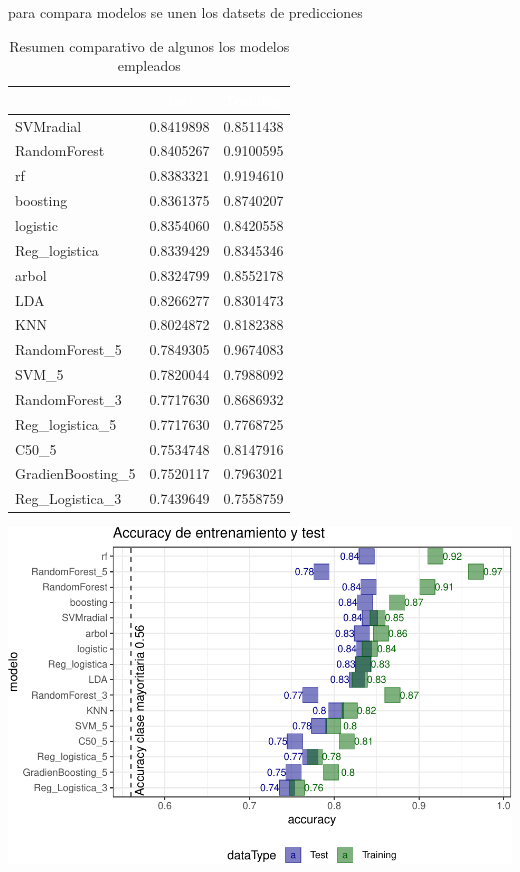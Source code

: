 \documentclass[]{article}
\begin{document}
para compara modelos se unen los datsets de predicciones

\begin{table}[!h]

\caption{\label{tab:cuadro_comparativo-modelos}Resumen comparativo de algunos los modelos empleados}
\centering
\begin{tabular}[t]{lrr}
\toprule
\rowcolor{black}  \multicolumn{1}{c}{\textcolor{white}{\textbf{object}}} & \multicolumn{1}{c}{\textcolor{white}{\textbf{Test}}} & \multicolumn{1}{c}{\textcolor{white}{\textbf{Training}}}\\
\midrule
\rowcolor{gray!6}  SVMradial & 0.8419898 & 0.8511438\\
RandomForest & 0.8405267 & 0.9100595\\
\rowcolor{gray!6}  rf & 0.8383321 & 0.9194610\\
boosting & 0.8361375 & 0.8740207\\
\rowcolor{gray!6}  logistic & 0.8354060 & 0.8420558\\
\addlinespace
Reg\_logistica & 0.8339429 & 0.8345346\\
\rowcolor{gray!6}  arbol & 0.8324799 & 0.8552178\\
LDA & 0.8266277 & 0.8301473\\
\rowcolor{gray!6}  KNN & 0.8024872 & 0.8182388\\
RandomForest\_5 & 0.7849305 & 0.9674083\\
\addlinespace
\rowcolor{gray!6}  SVM\_5 & 0.7820044 & 0.7988092\\
RandomForest\_3 & 0.7717630 & 0.8686932\\
\rowcolor{gray!6}  Reg\_logistica\_5 & 0.7717630 & 0.7768725\\
C50\_5 & 0.7534748 & 0.8147916\\
\rowcolor{gray!6}  GradienBoosting\_5 & 0.7520117 & 0.7963021\\
\addlinespace
Reg\_Logistica\_3 & 0.7439649 & 0.7558759\\
\bottomrule
\end{tabular}
\end{table}

\includegraphics{analisis_de_muchos_modelos_files/figure-latex/unnamed-chunk-53-1.pdf}
\end{document}
